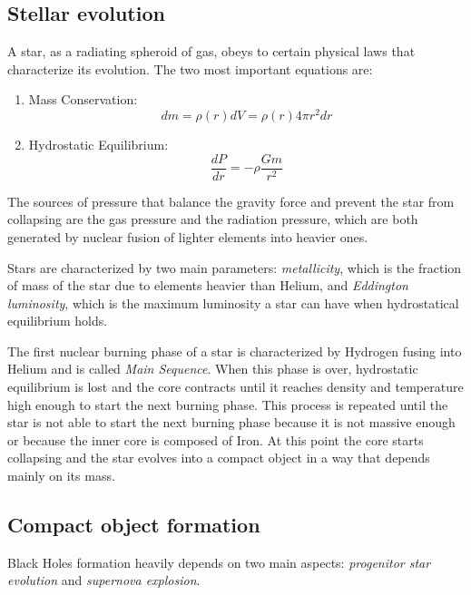 \documentclass[prb,twocolumn,9pt]{revtex4-1}
\begin{document}
\subsection{Stellar evolution}
A star, as a radiating spheroid of gas, obeys to certain physical laws that characterize its evolution. The two most important equations are:
\begin{enumerate}
   \item Mass Conservation: 
   \begin{equation}
      dm = \rho(r) dV = \rho(r) 4 \pi r^{2} dr
   \end{equation}
   \item Hydrostatic Equilibrium: 
   \begin{equation}
      \frac{dP}{dr} = -\rho \frac{G m}{r^{2}}
   \end{equation}
\end{enumerate}
The sources of pressure that balance the gravity force and prevent the star from collapsing are the gas pressure and the radiation pressure, which are both generated by nuclear fusion of lighter elements into heavier ones. 

Stars are characterized by two main parameters:
\textit{metallicity}, which is the fraction of mass of the star due to elements heavier than Helium, and \textit{Eddington luminosity}, which is the maximum luminosity a star can have when hydrostatical equilibrium holds.

The first nuclear burning phase of a star is characterized by Hydrogen fusing into Helium and is called \textit{Main Sequence}.
When this phase is over, hydrostatic equilibrium is lost and the core contracts until it reaches density and temperature high enough to start the next burning phase. 
This process is repeated until the star is not able to start the next burning phase because it is not massive enough or because the inner core is composed of Iron. 
At this point the core starts collapsing and the star evolves into a compact object in a way that depends mainly on its mass.

\subsection{Compact object formation}

Black Holes formation heavily depends on two main aspects: \textit{progenitor star evolution} and \textit{supernova explosion}.
\end{document}
